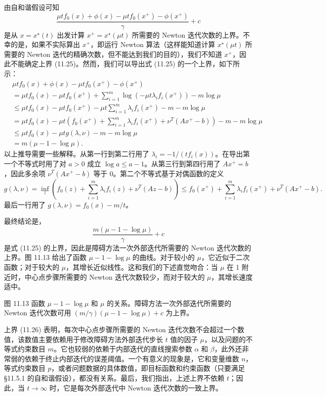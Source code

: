 \documentclass[UTF8, 12pt, fontset=fandol, oneside]{ctexart}
\begin{document}
由自和谐假设可知
\begin{equation}
\frac{\mu t f_0(x)+\phi(x)-\mu t f_0(x^+)-\phi(x^+)}{\gamma}+c
\tag{11.25}
\end{equation}
是从 $x=x^\star(t)$ 出发计算 $x^+=x^\star(\mu t)$ 所需要的 Newton 迭代次数的上界。不幸的是，如果不实际算出 $x^+$，即运行 Newton 算法（这样能知道计算 $x^\star(\mu t)$ 所需要的 Newton 迭代的精确次数，但不能达到我们的目的），我们不知道 $x^+$，因此不能确定上界 (11.25)。然而，我们可以导出式 (11.25) 的一个上界，如下所示：
\[
\begin{aligned}
&\mu t f_0(x)+\phi(x)-\mu t f_0(x^+)-\phi(x^+)\\
&=\mu t f_0(x)-\mu t f_0(x^+)+\sum_{i=1}^m\log(-\mu t\lambda_i f_i(x^+))-m\log\mu\\
&\leq \mu t f_0(x)-\mu t f_0(x^+)-\mu t\sum_{i=1}^m\lambda_i f_i(x^+)-m-m\log\mu\\
&=\mu t f_0(x)-\mu t\left(f_0(x^+)+\sum_{i=1}^m\lambda_i f_i(x^+)+\nu^T(Ax^+-b)\right)-m-m\log\mu\\
&\leq \mu t f_0(x)-\mu t g(\lambda,\nu)-m-m\log\mu\\
&=m(\mu-1-\log\mu).
\end{aligned}
\]
以上推导需要一些解释。从第一行到第二行用了 $\lambda_i=-1/(tf_i(x))$。在导出第一个不等式时用了对 $a>0$ 成立 $\log a\leq a-1$。从第三行到第四行用了 $Ax^+=b$，因此多余项 $\nu^T(Ax^+-b)$ 等于 0。第二个不等式基于对偶函数的定义
\[
g(\lambda,\nu)=\inf_z\left(f_0(z)+\sum_{i=1}^m\lambda_i f_i(z)+\nu^T(Az-b)\right)
\leq f_0(x^+)+\sum_{i=1}^m\lambda_i f_i(x^+)+\nu^T(Ax^+-b).
\]
最后一行用了 $g(\lambda,\nu)=f_0(x)-m/t$。

最终结论是，
\begin{equation}
\frac{m(\mu-1-\log\mu)}{\gamma}+c
\tag{11.26}
\end{equation}
是式 (11.25) 的上界，因此是障碍方法一次外部迭代所需要的 Newton 迭代次数的上界。图 11.13 给出了函数 $\mu-1-\log\mu$ 的曲线。对于较小的 $\mu$，它近似于二次函数；对于较大的 $\mu$，其增长近似线性。这和我们的下述直觉吻合：当 $\mu$ 在 1 附近时，中心点步骤所需要的 Newton 迭代次数较少，而对于较大的 $\mu$，其增长速度适中。

图 11.13 函数 $\mu-1-\log\mu$ 和 $\mu$ 的关系。障碍方法一次外部迭代所需要的 Newton 迭代次数可用 $(m/\gamma)(\mu-1-\log\mu)+c$ 为上界。

上界 (11.26) 表明，每次中心点步骤所需要的 Newton 迭代次数不会超过一个数值，该数值主要依赖用于修改障碍方法外部迭代步长 $t$ 值的因子 $\mu$，以及问题的不等式约束数目 $m$。它也较弱的依赖于内部迭代的直线搜索参数 $\alpha$ 和 $\beta$，此外还非常弱的依赖于终止内部迭代的误差阈值。一个有意义的现象是，它和变量维数 $n$，等式约束数目 $p$，或者问题数据的具体数值，即目标函数和约束函数（只要满足 \S11.5.1 的自和谐假设），都没有关系。最后，我们指出，上述上界不依赖 $t$；因此，当 $t\to\infty$ 时，它是每次外部迭代中 Newton 迭代次数的一致上界。
\end{document}
